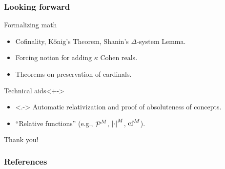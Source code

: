 \documentclass[english]{beamer}
\begin{document}
\begin{frame}
  \frametitle{Looking forward}
  \begin{block}{Formalizing math}
    \begin{itemize}
    \item<+-> Cofinality, K\H{o}nig's Theorem, Shanin's $\Delta$-system Lemma.
    \item<+-> Forcing notion for adding $\kappa$ Cohen reals.
    \item<+-> Theorems on preservation of cardinals.
    \end{itemize}
  \end{block}
  \begin{block}{Technical aids}<+->
    \begin{itemize}
    \item<.-> Automatic relativization and proof of absoluteness of concepts.
    \item<+-> ``Relative functions'' (e.g., $\P^M$, $\card{\cdot}^M$, $\cf^M$).
    \end{itemize}
  \end{block}
\end{frame}

\begin{frame}
  \begin{shadowblock}{}
    \begin{center}
      {\Huge Thank you!}
    \end{center}
  \end{shadowblock}
\end{frame}

\begin{frame}
  \frametitle{References}
  
  
\end{frame}
\end{document}
